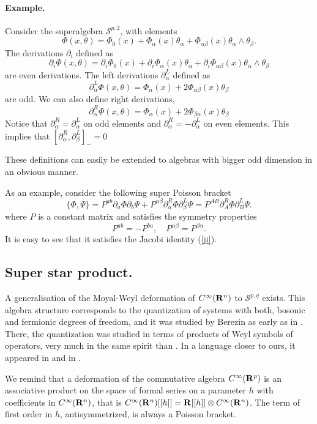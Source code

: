 \documentclass[a4paper,12pt]{article}
\begin{document}
\paragraph{Example.} Consider the superalgebra   $\mathcal{S}^{p,2}$, with 
elements
$$
\Phi(x,\theta)=\Phi_0(x)+\Phi_{\alpha}(x)\theta_\alpha+
\Phi_{\alpha\beta}(x)\theta_\alpha\wedge\theta_\beta.
$$
 The derivations $\partial_i$ defined as
$$
\partial_i\Phi(x,\theta)=\partial_i\Phi_0(x)+\partial_i\Phi_{\alpha}(x)
\theta_\alpha+
\partial_i\Phi_{\alpha\beta}(x)\theta_\alpha\wedge\theta_\beta
$$
 are  even derivations. The left derivations $\partial_\alpha^L$ defined
as
$$
 \partial^L_\alpha\Phi(x,\theta)=\Phi_{\alpha}(x)+
2\Phi_{\alpha\beta}(x)\theta_\beta
$$
are odd. We can also define right derivations,
$$
 \partial^R_\alpha\Phi(x,\theta)=\Phi_{\alpha}(x)+
2\Phi_{\beta\alpha}(x)\theta_\beta
$$
Notice that $\partial^R_\alpha=\partial^L_\alpha$ on odd elements and
$\partial^R_\alpha=-\partial^L_\alpha$ on even elements. This implies
that $[\partial_\alpha^R,\partial_\beta^L]_-=0$

 These definitions can easily be extended to algebras with bigger
odd dimension in an obvious manner.

\bigskip

As an example, consider the following super Poisson bracket
\begin{equation}
\{\Phi,\Psi\}=P^{ab}\partial_a\Phi\partial_b\Psi +
P^{\alpha \beta}\partial^R_\alpha\Phi\partial^L_\beta\Psi=
P^{AB}\partial^R_A\Phi\partial^L_B\Psi. 
\label{spb}
\end{equation}
where  $P$ is a  constant matrix and satisfies the symmetry properties
$$
P^{ab}=-P^{ba},\quad P^{\alpha\beta}=P^{\beta\alpha}.
$$
It is easy to see that it satisfies the Jacobi identity (\ref{ji}).

\subsection{Super star product.}
A generalisation of the Moyal-Weyl \cite{m} deformation of
$C^\infty({\bf R}^n)$ to $\mathcal{S}^{p,q}$ exists. This algebra structure
corresponds to the quantization of systems with both, bosonic and
fermionic degrees of freedom, and it was studied by Berezin
 as early as  in \cite{be}. There, the quantization was studied in
 terms of products of Weyl  symbols of
operators, very much in the same spirit than \cite{m}. In a language closer to
ours, it appeared  in  \cite{bf} and   in \cite{fza, fl}.

 We remind that a deformation of the commutative algebra $C^\infty({\bf R}^p)$
is an associative
product on the space of formal series on a parameter $h$ with coefficients
in
$C^\infty({\bf R}^n)$, that is
$C^\infty({\bf R}^n)[[h]]={\bf R}[[h]]\otimes C^\infty({\bf R}^n)$. The term of first
order in $h$, antisymmetrized, is always a Poisson bracket.
\end{document}
